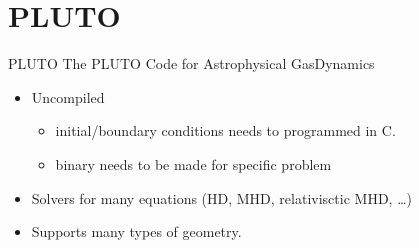 \documentclass{beamer}
\begin{document}
\section{PLUTO}
\begin{frame}{PLUTO}	
	The PLUTO Code for Astrophysical GasDynamics \cite{plutouserguide}
	\begin{itemize}
		\item Uncompiled
			\begin{itemize}
				\item initial/boundary conditions needs to programmed in C.
				\item binary needs to be made for specific problem
			\end{itemize} 		
		\item Solvers for many equations (HD, MHD, relativisctic MHD, \ldots)
		\item Supports many types of geometry. 
	\end{itemize}
\end{frame}
\end{document}
